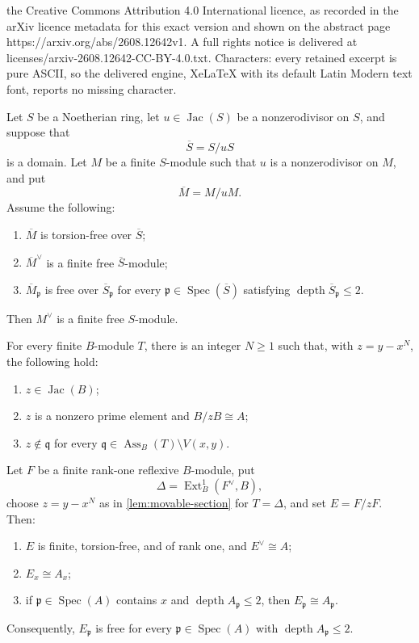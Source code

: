 \documentclass[10pt,a4paper]{amsart}
\newcommand{\Ass}{\operatorname{Ass}}
\newcommand{\Ext}{\operatorname{Ext}}
\newcommand{\Jac}{\operatorname{Jac}}
\newcommand{\Spec}{\operatorname{Spec}}
\newcommand{\depth}{\operatorname{depth}}
\begin{document}
the Creative Commons Attribution 4.0 International licence, as recorded in the arXiv licence metadata for this exact version and shown on the abstract page https://arxiv.org/abs/2608.12642v1. A full rights notice is delivered at licenses/arxiv-2608.12642-CC-BY-4.0.txt. Characters: every retained excerpt is pure ASCII, so the delivered engine, XeLaTeX with its default Latin Modern text font, reports no missing character.
\begin{lemma}
\label{lem:lifting-dual}
Let $S$ be a Noetherian ring, let $u\in\Jac(S)$ be a nonzerodivisor on
$S$, and suppose that
\[
  \overline S=S/uS
\]
is a domain.  Let $M$ be a finite $S$-module such that $u$ is a
nonzerodivisor on $M$, and put
\[
  \overline M=M/uM.
\]
Assume the following:
\begin{enumerate}[label=\textup{(\roman*)}]
  \item $\overline M$ is torsion-free over $\overline S$;
  \item $\overline M^\vee$ is a finite free $\overline S$-module;
  \item $\overline M_{\mathfrak p}$ is free over
  $\overline S_{\mathfrak p}$ for every
  $\mathfrak p\in\Spec(\overline S)$ satisfying
  $\depth\overline S_{\mathfrak p}\leq 2$.
\end{enumerate}
Then $M^\vee$ is a finite free $S$-module.
\end{lemma}

\begin{lemma}
\label{lem:movable-section}
For every finite $B$-module $T$, there is an integer $N\geq1$ such that,
with $z=y-x^N$, the following hold:
\begin{enumerate}[label=\textup{(\roman*)}]
  \item $z\in\Jac(B)$;
  \item $z$ is a nonzero prime element and $B/zB\cong A$;
  \item $z\notin\mathfrak q$ for every
        $\mathfrak q\in\Ass_B(T)\setminus V(x,y)$.
\end{enumerate}
\end{lemma}

\begin{proposition}
\label{prop:section-freeness}
Let $F$ be a finite rank-one reflexive $B$-module, put
\[
  \Delta=\Ext^1_B(F^\vee,B),
\]
choose $z=y-x^N$ as in \cref{lem:movable-section} for $T=\Delta$, and set
$E=F/zF$.  Then:
\begin{enumerate}[label=\textup{(\roman*)}]
  \item $E$ is finite, torsion-free, and of rank one, and
        $E^\vee\cong A$;
  \item $E_x\cong A_x$;
  \item if $\mathfrak p\in\Spec(A)$ contains $x$ and
        $\depth A_{\mathfrak p}\leq2$, then
        $E_{\mathfrak p}\cong A_{\mathfrak p}$.
\end{enumerate}
Consequently, $E_{\mathfrak p}$ is free for every
$\mathfrak p\in\Spec(A)$ with $\depth A_{\mathfrak p}\leq2$.
\end{proposition}
\end{document}
